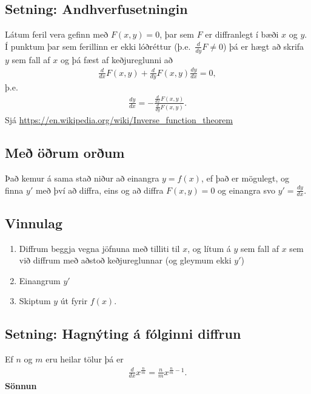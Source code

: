 \documentclass[b5paper,11pt,icelandic]{sphinxmanual}
\begin{document}
\subsection{Setning: Andhverfusetningin}
\label{kafli03:setning-andhverfusetningin}
Látum feril vera gefinn með \(F(x,y) =0\), þar sem \(F\) er
diffranlegt í bæði \(x\) og \(y\). Í punktum þar sem ferillinn
er ekki lóðréttur (þ.e. \(\frac{d}{dy}F \neq 0\)) þá er hægt að
skrifa \(y\) sem fall af \(x\) og þá fæst af keðjureglunni að
\begin{equation*}
\begin{split}\frac{d}{dx} F(x,y) + \frac{d}{dy}F(x,y) \frac{dy}{dx} = 0,\end{split}
\end{equation*}
þ.e.
\begin{equation*}
\begin{split}\frac{dy}{dx} = -\frac{\frac{d}{dx} F(x,y)}{\frac{d}{dy} F(x,y)}.\end{split}
\end{equation*}
Sjá \url{https://en.wikipedia.org/wiki/Inverse\_function\_theorem}


\subsection{Með öðrum orðum}
\label{kafli03:me-orum-orum}
Það kemur á sama stað niður að einangra \(y=f(x)\), ef það er
mögulegt, og finna \(y'\) með því að diffra, eins og að diffra
\(F(x,y)=0\) og einangra svo \(y'=\frac{dy}{dx}\).


\subsection{Vinnulag}
\label{kafli03:vinnulag}\begin{enumerate}
\item {} 
Diffrum beggja vegna jöfnuna með tilliti til \(x\), og lítum á
\(y\) sem fall af \(x\) sem við diffrum með aðstoð
keðjureglunnar (og gleymum ekki \(y'\))

\item {} 
Einangrum \(y'\)

\item {} 
Skiptum \(y\) út fyrir \(f(x)\).

\end{enumerate}


\subsection{Setning: Hagnýting á fólginni diffrun}
\label{kafli03:setning-hagnyting-a-folginni-diffrun}
Ef \(n\) og \(m\) eru heilar tölur þá er
\begin{equation*}
\begin{split}\frac{d}{dx} x^{\frac nm} = \frac nm x^{\frac nm -1}.\end{split}
\end{equation*}
\textbf{Sönnun}
\end{document}
